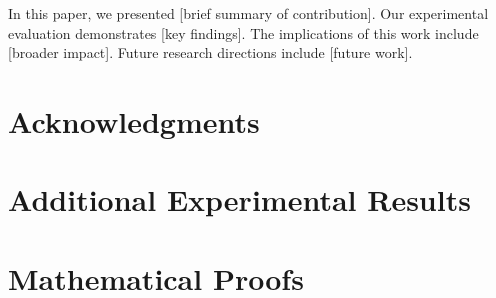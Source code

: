\documentclass[11pt,a4paper]{article}
\begin{document}

In this paper, we presented [brief summary of contribution]. Our experimental evaluation demonstrates [key findings]. The implications of this work include [broader impact]. Future research directions include [future work].

\section*{Acknowledgments}




\appendix
\section{Additional Experimental Results}
\label{app:additional_results}


\section{Mathematical Proofs}
\label{app:proofs}

\end{document}
